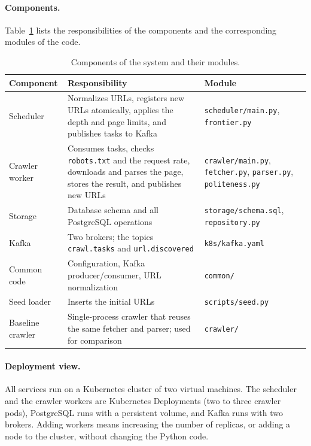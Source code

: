 \paragraph{Components.} Table~\ref{tab:components} lists the responsibilities of the components and the corresponding modules of the code.

\begin{table}[H]
\centering
\begin{tabular}{|p{2.8cm}|p{6.2cm}|p{4.4cm}|}
\hline
\textbf{Component} & \textbf{Responsibility} & \textbf{Module} \\
\hline
Scheduler & Normalizes URLs, registers new URLs atomically, applies the depth and page limits, and publishes tasks to Kafka & \texttt{scheduler/main.py}, \texttt{frontier.py} \\
\hline
Crawler worker & Consumes tasks, checks \texttt{robots.txt} and the request rate, downloads and parses the page, stores the result, and publishes new URLs & \texttt{crawler/main.py}, \texttt{fetcher.py}, \texttt{parser.py}, \texttt{politeness.py} \\
\hline
Storage & Database schema and all PostgreSQL operations & \texttt{storage/schema.sql}, \texttt{repository.py} \\
\hline
Kafka & Two brokers; the topics \texttt{crawl.tasks} and \texttt{url.discovered} & \texttt{k8s/kafka.yaml} \\
\hline
Common code & Configuration, Kafka producer/consumer, URL normalization & \texttt{common/} \\
\hline
Seed loader & Inserts the initial URLs & \texttt{scripts/seed.py} \\
\hline
Baseline crawler & Single-process crawler that reuses the same fetcher and parser; used for comparison & \texttt{crawler/} \\
\hline
\end{tabular}
\caption{Components of the system and their modules.}
\label{tab:components}
\end{table}

\paragraph{Deployment view.} All services run on a Kubernetes cluster of two virtual machines. The scheduler and the crawler workers are Kubernetes Deployments (two to three crawler pods), PostgreSQL runs with a persistent volume, and Kafka runs with two brokers. Adding workers means increasing the number of replicas, or adding a node to the cluster, without changing the Python code.

